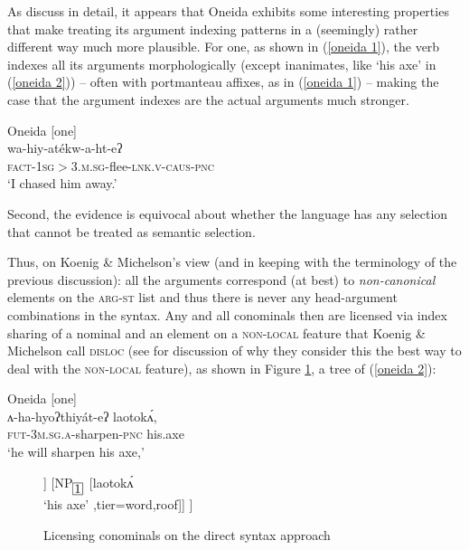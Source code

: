 \documentclass[output=paper
                ,modfonts
                ,nonflat
	        ,collection
	        ,collectionchapter
	        ,collectiontoclongg
 	        ,biblatex
                ,babelshorthands
                ,newtxmath
                ,draftmode
                ,colorlinks, citecolor=brown
]{./langsci/langscibook}
\begin{document}
{As \citet{KM15} discuss in detail, it appears that Oneida exhibits some interesting properties that make treating its argument indexing patterns in a (seemingly) rather different way much more plausible. For one, as shown in (\ref{oneida 1}), the verb indexes all its arguments morphologically (except inanimates, like `his axe' in (\ref{oneida 2})) -- often with portmanteau affixes, as in (\ref{oneida 1}) -- making the case that the argument indexes are the actual arguments much stronger. 
%
\begin{exe}
\ex\label{oneida 1} Oneida [one] \citep[5]{KM15} \\
\gll wa-hiy-at\'{e}{\textperiodcentered}kw-a-ht-eʔ \\
\textsc{fact}-\textsc{1sg$>$3.m.sg}-flee-\textsc{lnk.v}-\textsc{caus}-\textsc{pnc} \\
\glt `I chased him away.' 
\end{exe} 
%
Second, the evidence is equivocal about whether the language has any selection that cannot be treated as semantic selection.

Thus, on Koenig \& Michelson's view (and in keeping with the terminology of the previous discussion): all the arguments correspond (at best) to \textit{non-canonical} elements on the \textsc{arg-st} list and thus there is never any head-argument combinations in the syntax. Any and all conominals then are licensed via index sharing of a nominal and an element on a \textsc{non-local} feature that Koenig \& Michelson call  \textsc{disloc} (see \citealt[39]{KM15} for discussion of why they consider this the best way to deal with  the \textsc{non-local} feature), as shown in Figure \ref{nonlocal tree}, a tree of (\ref{oneida 2}):
\begin{exe}
\ex\label{oneida 2} Oneida [one] \citep[17]{KM15} \\
\gll ʌ-ha-hyoʔthi{\textperiodcentered}y\'{a}t-eʔ laoto{\textperiodcentered}k\'{ʌ}{\textperiodcentered},\\
\textsc{fut}-\textsc{3m.sg.a}-sharpen-\textsc{pnc} his.axe \\
\glt `he will sharpen his axe,'
\end{exe} 
%
\begin{figure}[htp]
\centering
\begin{forest}
[ \begin{avm}
\[ \textsc{head} & \tpv{verb} \\
   \textsc{disloc} & \esetDB \]
\end{avm} 
	[ \begin{avm}
    	 \[ \textsc{head} & \tpv{verb} \\
   	\textsc{disloc} & \q\{ \@1 \q\}     \]
   	\end{avm}
	[ʌhahyoʔthi{\textperiodcentered}y\'{a}teʔ \\ `he will sharpen' , tier=word]]
	[NP$_{\avmbox{1}}$ [laoto{\textperiodcentered}k\'{ʌ}{\textperiodcentered} \\ `his axe' ,tier=word,roof]] ]
\end{forest}
\caption{Licensing conominals on the direct syntax approach}
\label{nonlocal tree}
\end{figure}
 

}
\end{document}
